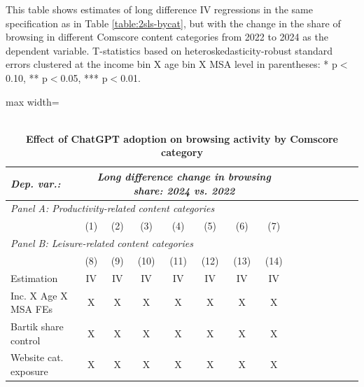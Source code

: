 \documentclass[12pt]{article}
\begin{document}
\begin{table}[htbp]
\caption{\\ \centering \textbf{Effect of ChatGPT adoption on browsing activity by Comscore category}}  

\vspace{-0.1cm} \label{table:2sls-bycontent} \footnotesize  This table shows estimates of long difference IV regressions in the same specification as in Table \ref{table:2sls-bycat}, but with the change in the share of browsing in different Comscore content categories from 2022 to 2024 as the dependent variable. T-statistics based on heteroskedasticity-robust standard errors clustered at the income bin X age bin X MSA level in parentheses: * p$<$0.10, ** p$<$0.05, *** p$<$0.01. 

\vspace{0.1cm}
 \centering \setlength{\tabcolsep}{2pt}
\begin{adjustbox}{max width=\textwidth}
\begin{tabular}{@{}l*{14}{c}@{}} 
\toprule
\textit{Dep. var.:} &  \multicolumn{7}{c}{\textit{Long difference change in browsing share: 2024 vs. 2022}}\\
\midrule
 \multicolumn{8}{l}{\textit{Panel A: Productivity-related content categories}} \\
 &  (1) & (2) & (3) & (4) & (5) & (6) & (7)  \\

\midrule
 \multicolumn{8}{l}{\textit{Panel B: Leisure-related content categories}} \\
 &  (8) & (9) & (10) & (11) & (12) & (13) & (14)  \\

 	Estimation & IV & IV & IV & IV & IV & IV & IV   \\ 
Inc. X Age X MSA FEs      & X & X	& X & X	& X & X	& X      \\	
Bartik share control     & X & X	& X & X	& X & X	& X      \\	
Website cat. exposure    & X & X	& X & X	& X & X	& X      \\	
    \bottomrule
\end{tabular}
\end{adjustbox}
\end{table}



 
\end{document}
